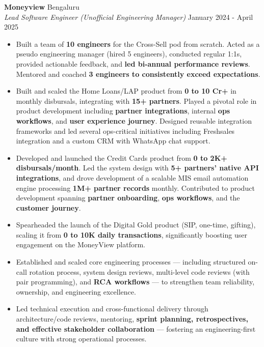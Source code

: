 \documentclass[10pt,a4paper]{article}
\begin{document}
\textbf{Moneyview} \hfill Bengaluru\\
\textit{Lead Software Engineer (Unofficial Engineering Manager)} \hfill January 2024 - April 2025\\
\vspace{-1mm}
\begin{itemize} \itemsep 1pt
	\item Built a team of \textbf{10 engineers} for the Cross-Sell pod from scratch. Acted as a pseudo engineering manager (hired 5 engineers), conducted regular 1:1s, provided actionable feedback, and \textbf{led bi-annual performance reviews}. Mentored and coached \textbf{3 engineers to consistently exceed expectations}.

    \item Built and scaled the Home Loans/LAP product from \textbf{0 to 10 Cr+} in monthly disbursals, integrating with \textbf{15+ partners}. Played a pivotal role in product development including \textbf{partner integrations}, internal \textbf{ops workflows}, and \textbf{user experience journey}. Designed reusable integration frameworks and led several ops-critical initiatives including Freshsales integration and a custom CRM with WhatsApp chat support.

    \item Developed and launched the Credit Cards product from \textbf{0 to 2K+ disbursals/month}. Led the system design with \textbf{5+ partners' native API integrations}, and drove development of a scalable MIS email automation engine processing \textbf{1M+ partner records} monthly. Contributed to product development spanning \textbf{partner onboarding}, \textbf{ops workflows}, and the \textbf{customer journey}.

    \item Spearheaded the launch of the Digital Gold product (SIP, one-time, gifting), scaling it from \textbf{0 to 10K daily transactions}, significantly boosting user engagement on the MoneyView platform.

    \item Established and scaled core engineering processes — including structured on-call rotation process, system design reviews, multi-level code reviews (with pair programming), and \textbf{RCA workflows} — to strengthen team reliability, ownership, and engineering excellence.

    \item Led technical execution and cross-functional delivery through architecture/code reviews, mentoring, \textbf{sprint planning, retrospectives, and effective stakeholder collaboration} — fostering an engineering-first culture with strong operational processes.


\end{itemize}
\end{document}
